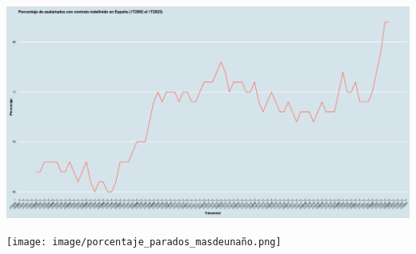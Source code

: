 \begin{enumerate}
	\begin{center}
	    \includegraphics[scale=0.26]{image/porcentaje_asalariados_indefinido.png}
	\end{center}
	\vspace{.5cm}

	\begin{center}
	    \texttt{[image: image/porcentaje\_parados\_masdeunaño.png]}
	\end{center}
	\vspace{.5cm}


\end{enumerate}
